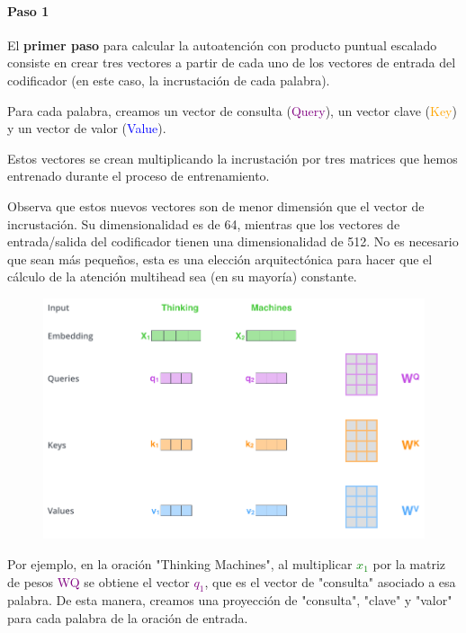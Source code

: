 \paragraph{Paso 1}

El \textbf{primer paso} para calcular la autoatención con producto puntual escalado consiste en crear tres vectores a partir de cada uno de los vectores de entrada del codificador (en este caso, la incrustación de cada palabra).

Para cada palabra, creamos un vector de consulta (\textcolor{purple}{Query}), un vector clave (\textcolor{orange}{Key}) y un vector de valor (\textcolor{blue}{Value}).

Estos vectores se crean multiplicando la incrustación por tres matrices que hemos entrenado durante el proceso de entrenamiento.

Observa que estos nuevos vectores son de menor dimensión que el vector de incrustación. Su dimensionalidad es de 64, mientras que los vectores de entrada/salida del codificador tienen una dimensionalidad de 512. No es necesario que sean más pequeños, esta es una elección arquitectónica para hacer que el cálculo de la atención multihead sea (en su mayoría) constante.

\begin{figure}[h]
  \centering
  \includegraphics[scale=0.3]{pics/transformer_self_attention_vectors.png}
\end{figure}

Por ejemplo, en la oración "Thinking Machines", al multiplicar \textcolor{green}{$x_1$} por la matriz de pesos \textcolor{purple}{WQ} se obtiene el vector \textcolor{purple}{$q_1$}, que es el vector de "consulta" asociado a esa palabra. De esta manera, creamos una proyección de "consulta", "clave" y "valor" para cada palabra de la oración de entrada.

